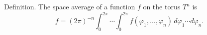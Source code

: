Definition. The space average of a function $f$ on the torus $T^n$ is
$$\bar{f} = (2\pi)^{-n} \int_{0}^{2\pi} \cdots \int_{0}^{2\pi} f(\varphi_1, \ldots, \varphi_n) \, d\varphi_1 \cdots d\varphi_n.$$
